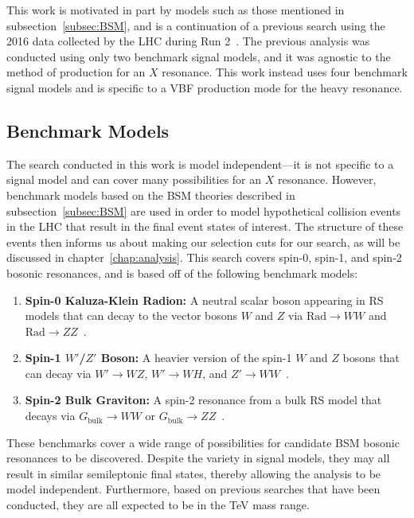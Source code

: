 This work is motivated in part by models such as those mentioned in subsection~\ref{subsec:BSM}, and is a continuation of a previous search using the 2016 data collected by the LHC during Run 2~\cite{Sirunyan_18}.
The previous analysis was conducted using only two benchmark signal models, and it was agnostic to the method of production for an $X$ resonance.
This work instead uses four benchmark signal models and is specific to a VBF production mode for the heavy resonance.

\subsection{Benchmark Models}

The search conducted in this work is model independent---it is not specific to a signal model and can cover many possibilities for an $X$ resonance.
However, benchmark models based on the BSM theories described in subsection~\ref{subsec:BSM} are used in order to model hypothetical collision events in the LHC that result in the final event states of interest.
The structure of these events then informs us about making our selection cuts for our search, as will be discussed in chapter~\ref{chap:analysis}.
This search covers spin-0, spin-1, and spin-2 bosonic resonances, and is based off of the following benchmark models:
\begin{enumerate}
  \item \textbf{Spin-0 Kaluza-Klein Radion:} A neutral scalar boson appearing in RS models that can decay to the vector bosons $W$ and $Z$ via $\mathrm{Rad}\to WW$ and $\mathrm{Rad}\to ZZ$~\cite{Goldberger_1999,Goldberger_2000}.
  \item \textbf{Spin-1 $W'$/$Z'$ Boson:} A heavier version of the spin-1 $W$ and $Z$ bosons that can decay via $W'\to WZ$, $W'\to WH$, and $Z'\to WW$~\cite{Pappadopulo_2014}.
  \item \textbf{Spin-2 Bulk Graviton:} A spin-2 resonance from a bulk RS model that decays via $G_\mathrm{bulk}\to WW$ or $G_\mathrm{bulk}\to ZZ$~\cite{Fitzpatrick_2007,PhysRevD.76.036006}.
\end{enumerate}

These benchmarks cover a wide range of possibilities for candidate BSM bosonic resonances to be discovered.
Despite the variety in signal models, they may all result in similar semileptonic final states, thereby allowing the analysis to be model independent.
Furthermore, based on previous searches that have been conducted, they are all expected to be in the TeV mass range. %

